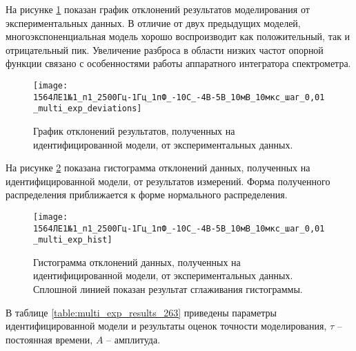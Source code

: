 	На рисунке \ref{pic:multi_exp_deviations_263} показан график отклонений
	результатов моделирования от экспериментальных данных. В отличие от двух
	предыдущих моделей, многоэкспоненциальная модель хорошо воспроизводит 
	как положительный, так и отрицательный пик. Увеличение разброса в области
	низких частот опорной функции связано с особенностями работы аппаратного
	интегратора спектрометра.

	\begin{figure}[!htp]
		\centering
		\texttt{[image: 1564ЛЕ1№1\_п1\_2500Гц-1Гц\_1пФ\_-10С\_-4В-5В\_10мВ\_10мкс\_шаг\_0,01\_multi\_exp\_deviations]}
		\caption{График отклонений результатов, полученных на идентифицированной
		модели, от экспериментальных данных.}
		\label{pic:multi_exp_deviations_263}
	\end{figure}

	На рисунке \ref{pic:multi_exp_hist_263} показана гистограмма отклонений 
	данных, полученных на идентифицированной модели, от результатов измерений.
	Форма полученного распределения приближается к форме нормального распределения.

	\begin{figure}[!htp]
		\centering
		\texttt{[image: 1564ЛЕ1№1\_п1\_2500Гц-1Гц\_1пФ\_-10С\_-4В-5В\_10мВ\_10мкс\_шаг\_0,01\_multi\_exp\_hist]}
		\caption{Гистограмма отклонений данных, полученных на идентифицированной 
		         модели, от экспериментальных данных. Сплошной линией показан 
		         результат сглаживания гистограммы.}
		\label{pic:multi_exp_hist_263}
	\end{figure}

	В таблице \ref{table:multi_exp_results_263} приведены параметры 
	идентифицированной модели и результаты оценок точности моделирования,  
	$\tau$ -- постоянная времени, $A$ -- амплитуда.

